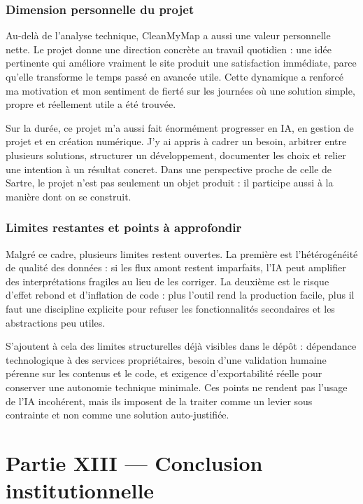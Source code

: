 \documentclass[
  10pt,
  a4paper,
  DIV=11,
  numbers=noendperiod,
  oneside]{scrreprt}
\begin{document}
\subsection{Dimension personnelle du
projet}\label{dimension-personnelle-du-projet}

Au-delà de l'analyse technique, CleanMyMap a aussi une valeur
personnelle nette. Le projet donne une direction concrète au travail
quotidien : une idée pertinente qui améliore vraiment le site produit
une satisfaction immédiate, parce qu'elle transforme le temps passé en
avancée utile. Cette dynamique a renforcé ma motivation et mon sentiment
de fierté sur les journées où une solution simple, propre et réellement
utile a été trouvée.

Sur la durée, ce projet m'a aussi fait énormément progresser en IA, en
gestion de projet et en création numérique. J'y ai appris à cadrer un
besoin, arbitrer entre plusieurs solutions, structurer un développement,
documenter les choix et relier une intention à un résultat concret. Dans
une perspective proche de celle de Sartre, le projet n'est pas seulement
un objet produit : il participe aussi à la manière dont on se construit.

\subsection{Limites restantes et points à
approfondir}\label{limites-restantes-et-points-uxe0-approfondir}

Malgré ce cadre, plusieurs limites restent ouvertes. La première est
l'hétérogénéité de qualité des données : si les flux amont restent
imparfaits, l'IA peut amplifier des interprétations fragiles au lieu de
les corriger. La deuxième est le risque d'effet rebond et d'inflation de
code : plus l'outil rend la production facile, plus il faut une
discipline explicite pour refuser les fonctionnalités secondaires et les
abstractions peu utiles.

S'ajoutent à cela des limites structurelles déjà visibles dans le dépôt
: dépendance technologique à des services propriétaires, besoin d'une
validation humaine pérenne sur les contenus et le code, et exigence
d'exportabilité réelle pour conserver une autonomie technique minimale.
Ces points ne rendent pas l'usage de l'IA incohérent, mais ils imposent
de la traiter comme un levier sous contrainte et non comme une solution
auto-justifiée.

\chapter{Partie XIII --- Conclusion
institutionnelle}\label{partie-xiii-conclusion-institutionnelle}
\end{document}
